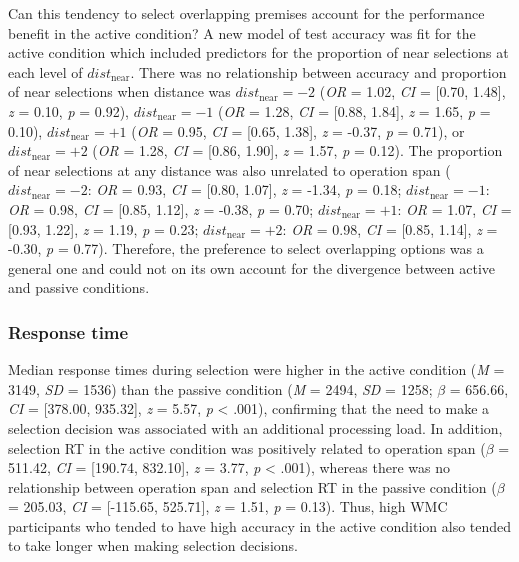 \documentclass[floatsintext,man]{apa6}
\theoremstyle{definition}
\theoremstyle{definition}
\theoremstyle{definition}
\theoremstyle{remark}
\begin{document}
Can this tendency to select overlapping premises account for the
performance benefit in the active condition? A new model of test
accuracy was fit for the active condition which included predictors for
the proportion of near selections at each level of
\(dist_{\text{near}}\). There was no relationship between accuracy and
proportion of near selections when distance was
\(dist_{\text{near}}=-2\) (\emph{OR} = 1.02, \emph{CI} = {[}0.70,
1.48{]}, \emph{z} = 0.10, \emph{p} = 0.92), \(dist_{\text{near}}=-1\)
(\emph{OR} = 1.28, \emph{CI} = {[}0.88, 1.84{]}, \emph{z} = 1.65,
\emph{p} = 0.10), \(dist_{\text{near}}=+1\) (\emph{OR} = 0.95, \emph{CI}
= {[}0.65, 1.38{]}, \emph{z} = -0.37, \emph{p} = 0.71), or
\(dist_{\text{near}}=+2\) (\emph{OR} = 1.28, \emph{CI} = {[}0.86,
1.90{]}, \emph{z} = 1.57, \emph{p} = 0.12). The proportion of near
selections at any distance was also unrelated to operation span
(\(dist_{\text{near}}=-2\): \emph{OR} = 0.93, \emph{CI} = {[}0.80,
1.07{]}, \emph{z} = -1.34, \emph{p} = 0.18; \(dist_{\text{near}}=-1\):
\emph{OR} = 0.98, \emph{CI} = {[}0.85, 1.12{]}, \emph{z} = -0.38,
\emph{p} = 0.70; \(dist_{\text{near}}=+1\): \emph{OR} = 1.07, \emph{CI}
= {[}0.93, 1.22{]}, \emph{z} = 1.19, \emph{p} = 0.23;
\(dist_{\text{near}}=+2\): \emph{OR} = 0.98, \emph{CI} = {[}0.85,
1.14{]}, \emph{z} = -0.30, \emph{p} = 0.77). Therefore, the preference
to select overlapping options was a general one and could not on its own
account for the divergence between active and passive conditions.

\subsubsection{Response time}\label{response-time-1}

Median response times during selection were higher in the active
condition (\emph{M} = 3149, \emph{SD} = 1536) than the passive condition
(\emph{M} = 2494, \emph{SD} = 1258; \(\beta\) = 656.66, \emph{CI} =
{[}378.00, 935.32{]}, \emph{z} = 5.57, \emph{p} \textless{} .001),
confirming that the need to make a selection decision was associated
with an additional processing load. In addition, selection RT in the
active condition was positively related to operation span (\(\beta\) =
511.42, \emph{CI} = {[}190.74, 832.10{]}, \emph{z} = 3.77, \emph{p}
\textless{} .001), whereas there was no relationship between operation
span and selection RT in the passive condition (\(\beta\) = 205.03,
\emph{CI} = {[}-115.65, 525.71{]}, \emph{z} = 1.51, \emph{p} = 0.13).
Thus, high WMC participants who tended to have high accuracy in the
active condition also tended to take longer when making selection
decisions.
\end{document}
